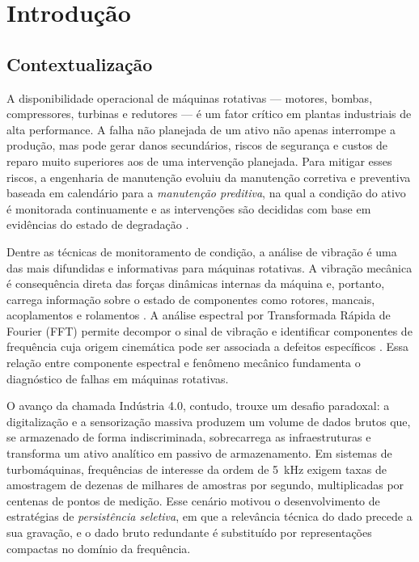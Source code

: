 \chapter{Introdução}
\label{cap:introducao}

\section{Contextualização}

A disponibilidade operacional de máquinas rotativas --- motores, bombas,
compressores, turbinas e redutores --- é um fator crítico em plantas
industriais de alta performance. A falha não planejada de um ativo não apenas
interrompe a produção, mas pode gerar danos secundários, riscos de segurança e
custos de reparo muito superiores aos de uma intervenção planejada. Para
mitigar esses riscos, a engenharia de manutenção evoluiu da manutenção
corretiva e preventiva baseada em calendário para a \emph{manutenção
preditiva}, na qual a condição do ativo é monitorada continuamente e as
intervenções são decididas com base em evidências do estado de degradação
\cite{scheffer2004,randall2011}.

Dentre as técnicas de monitoramento de condição, a análise de vibração é uma
das mais difundidas e informativas para máquinas rotativas. A vibração mecânica
é consequência direta das forças dinâmicas internas da máquina e, portanto,
carrega informação sobre o estado de componentes como rotores, mancais,
acoplamentos e rolamentos \cite{harris2002}. A análise espectral por
Transformada Rápida de Fourier (FFT) permite decompor o sinal de vibração e
identificar componentes de frequência cuja origem cinemática pode ser
associada a defeitos específicos \cite{randall2011,cooley1965}. Essa relação
entre componente espectral e fenômeno mecânico fundamenta o diagnóstico de
falhas em máquinas rotativas.

O avanço da chamada Indústria 4.0, contudo, trouxe um desafio paradoxal: a
digitalização e a sensorização massiva produzem um volume de dados brutos que,
se armazenado de forma indiscriminada, sobrecarrega as infraestruturas e
transforma um ativo analítico em passivo de armazenamento. Em sistemas de
turbomáquinas, frequências de interesse da ordem de 5~kHz exigem taxas de
amostragem de dezenas de milhares de amostras por segundo, multiplicadas por
centenas de pontos de medição. Esse cenário motivou o desenvolvimento de
estratégias de \emph{persistência seletiva}, em que a relevância técnica do
dado precede a sua gravação, e o dado bruto redundante é substituído por
representações compactas no domínio da frequência.

